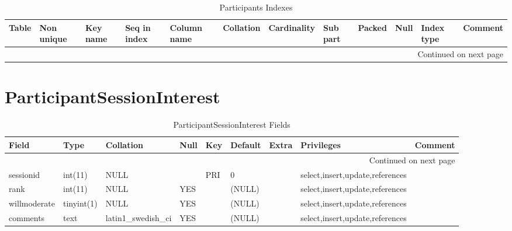 \documentclass[tablesignature,landscape]{scrartcl}
\begin{document}
\begin{longtable}{|l|l|l|l|l|l|l|l|l|l|l|l|}
\caption{Participants Indexes} \label{tbl:participantsindexes}\\
\hline
 Table         &  Non unique  &  Key name  &  Seq in index  &  Column name  &  Collation  &  Cardinality  &  Sub part  &  Packed  &  Null  &  Index type  &  Comment \\
\hline
\endhead
\hline\multicolumn{12}{r}{Continued on next page}\
\endfoot
\endlastfoot
\hline
 Participants  &           0  &  PRIMARY   &             1  &  badgeid      &  A          &            2  &  (NULL)    &  (NULL)  &        &  BTREE       &           \\
\hline
\end{longtable}
\section{ParticipantSessionInterest}
\label{sec-11}


\begin{longtable}{|l|l|l|l|l|l|l|l|l|}
\caption{ParticipantSessionInterest Fields} \label{tbl:participantsessioninterestfields}\\
\hline
 Field         &  Type         &  Collation                &  Null  &  Key  &  Default  &  Extra  &  Privileges                       &  Comment \\
\hline
\endhead
\hline\multicolumn{9}{r}{Continued on next page}\
\endfoot
\endlastfoot
\hline
 badgeid       &  varchar(15)  &  latin1\_{}swedish\_{}ci  &        &  PRI  &           &         &  select,insert,update,references  &           \\
 sessionid     &  int(11)      &  NULL                     &        &  PRI  &  0        &         &  select,insert,update,references  &           \\
 rank          &  int(11)      &  NULL                     &  YES   &       &  (NULL)   &         &  select,insert,update,references  &           \\
 willmoderate  &  tinyint(1)   &  NULL                     &  YES   &       &  (NULL)   &         &  select,insert,update,references  &           \\
 comments      &  text         &  latin1\_{}swedish\_{}ci  &  YES   &       &  (NULL)   &         &  select,insert,update,references  &           \\
\hline
\end{longtable}
\end{document}
